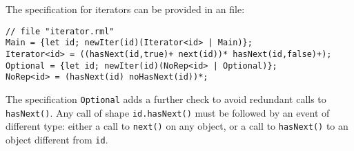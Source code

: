 The specification for iterators can be provided in an \rml file:
\begin{lstlisting}[basicstyle=\tt\footnotesize]
// file "iterator.rml"      
Main = {let id; newIter(id)(Iterator<id> | Main)};
Iterator<id> = ((hasNext(id,true)+ next(id))* hasNext(id,false)+);   
Optional = {let id; newIter(id)(NoRep<id> | Optional)};
NoRep<id> = (hasNext(id) noHasNext(id))*; 
\end{lstlisting}
The specification \lstinline|Optional| adds a further check to avoid redundant calls to \lstinline|hasNext()|. Any call of shape \lstinline|id.hasNext()| must be followed by an event of different type: either a call to \lstinline|next()| on any object, or a call to \lstinline|hasNext()| to an object different from \lstinline|id|.


